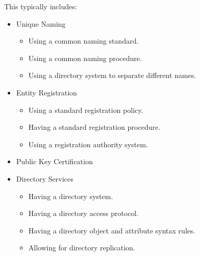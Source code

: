 \begin{questions}
\begin{parts}
\begin{solution}
      This typically includes:
      \begin{itemize}[noitemsep]
      \item Unique Naming
        \begin{itemize}[noitemsep]
        \item Using a common naming standard.
        \item Using a common naming procedure.
        \item Using a directory system to separate different names.
        \end{itemize}
      \item Entity Registration
        \begin{itemize}[noitemsep]
        \item Using a standard registration policy.
        \item Having a standard registration procedure.
        \item Using a registration authority system.
        \end{itemize}
      \item Public Key Certification
      \item Directory Services
        \begin{itemize}[noitemsep]
        \item Having a directory system.
        \item Having a directory access protocol.
        \item Having a directory object and attribute syntax rules.
        \item Allowing for directory replication.
        \end{itemize}
      \end{itemize}
    \end{solution}


\end{parts}
\end{questions}
